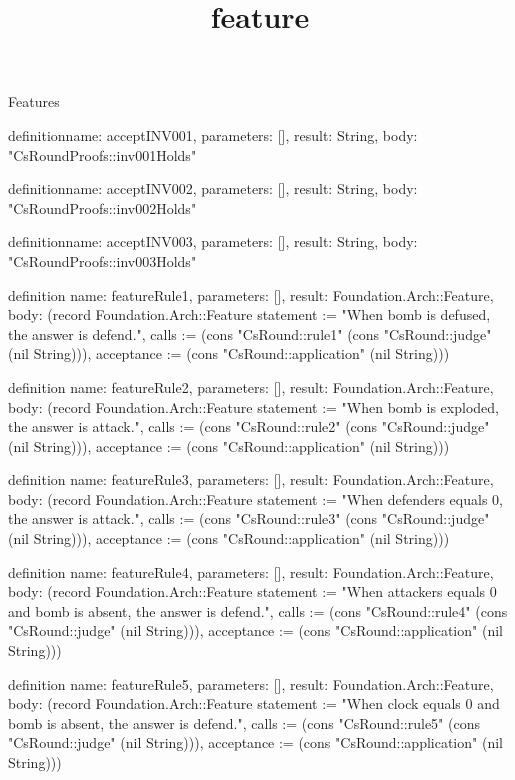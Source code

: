 \begin{lexlean}{Features}
\title{feature}
\begin{semanticmodule}
definition{name: acceptINV001, parameters: [], result: String, body: "CsRoundProofs::inv001Holds"}

definition{name: acceptINV002, parameters: [], result: String, body: "CsRoundProofs::inv002Holds"}

definition{name: acceptINV003, parameters: [], result: String, body: "CsRoundProofs::inv003Holds"}

definition{
  name: featureRule1,
  parameters: [],
  result: Foundation.Arch::Feature,
  body: (record Foundation.Arch::Feature {statement := "When bomb is defused, the answer is defend.", calls := (cons "CsRound::rule1" (cons "CsRound::judge" (nil String))), acceptance := (cons "CsRound::application" (nil String))})
}

definition{
  name: featureRule2,
  parameters: [],
  result: Foundation.Arch::Feature,
  body: (record Foundation.Arch::Feature {statement := "When bomb is exploded, the answer is attack.", calls := (cons "CsRound::rule2" (cons "CsRound::judge" (nil String))), acceptance := (cons "CsRound::application" (nil String))})
}

definition{
  name: featureRule3,
  parameters: [],
  result: Foundation.Arch::Feature,
  body: (record Foundation.Arch::Feature {statement := "When defenders equals 0, the answer is attack.", calls := (cons "CsRound::rule3" (cons "CsRound::judge" (nil String))), acceptance := (cons "CsRound::application" (nil String))})
}

definition{
  name: featureRule4,
  parameters: [],
  result: Foundation.Arch::Feature,
  body: (record Foundation.Arch::Feature {statement := "When attackers equals 0 and bomb is absent, the answer is defend.", calls := (cons "CsRound::rule4" (cons "CsRound::judge" (nil String))), acceptance := (cons "CsRound::application" (nil String))})
}

definition{
  name: featureRule5,
  parameters: [],
  result: Foundation.Arch::Feature,
  body: (record Foundation.Arch::Feature {statement := "When clock equals 0 and bomb is absent, the answer is defend.", calls := (cons "CsRound::rule5" (cons "CsRound::judge" (nil String))), acceptance := (cons "CsRound::application" (nil String))})
}


\end{semanticmodule}
\end{lexlean}
